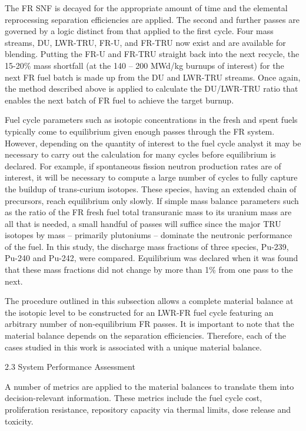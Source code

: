 	The FR SNF is decayed for the appropriate amount of time and the
elemental reprocessing separation efficiencies are applied.  The second
and further passes are governed by a logic distinct from that applied to
the first cycle.  Four mass streams, DU, LWR-TRU, FR-U, and FR-TRU now
exist and are available for blending.  Putting the FR-U and FR-TRU
straight back into the next recycle, the 15-20\% mass shortfall (at the
140 -- 200 MWd/kg burnups of interest) for the next FR fuel batch is
made up from the DU and LWR-TRU streams.  Once again, the method
described above is applied to calculate the DU/LWR-TRU ratio that
enables the next batch of FR fuel to achieve the target burnup.  

	Fuel cycle parameters such as isotopic concentrations in the fresh and
spent fuels typically come to equilibrium given enough passes through
the FR system.  However, depending on the quantity of interest to the
fuel cycle analyst it may be necessary to carry out the calculation for
many cycles before equilibrium is declared.  For example, if spontaneous
fission neutron production rates are of interest, it will be necessary
to compute a large number of cycles to fully capture the buildup of
trans-curium isotopes.  These species, having an extended chain of
precursors, reach equilibrium only slowly.  If simple mass balance
parameters such as the ratio of the FR fresh fuel total transuranic mass
to its uranium mass are all that is needed, a small handful of passes
will suffice since the major TRU isotopes by mass -- primarily
plutoniums -- dominate the neutronic performance of the fuel.  In this
study, the discharge mass fractions of three species, Pu-239, Pu-240 and
Pu-242, were compared.  Equilibrium was declared when it was found that
these mass fractions did not change by more than 1\% from one pass to
the next.

	The procedure outlined in this subsection allows a complete material
balance at the isotopic level to be constructed for an LWR-FR fuel cycle
featuring an arbitrary number of non-equilibrium FR passes.  It is
important to note that the material balance depends on the separation
efficiencies.  Therefore, each of the cases studied in this work is
associated with a unique material balance.

2.3 System Performance Assessment

A number of metrics are applied to the material balances to translate
them into decision-relevant information.  These metrics include the fuel
cycle cost, proliferation resistance, repository capacity via thermal
limits, dose release and toxicity.

